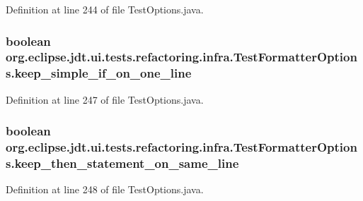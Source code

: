 Definition at line 244 of file TestOptions.java.

\hypertarget{classorg_1_1eclipse_1_1jdt_1_1ui_1_1tests_1_1refactoring_1_1infra_1_1TestFormatterOptions_a6d5e811d1475070205a1b68ec156213f}{
\subsubsection[{keep\_\-simple\_\-if\_\-on\_\-one\_\-line}]{\setlength{\rightskip}{0pt plus 5cm}boolean {\bf org.eclipse.jdt.ui.tests.refactoring.infra.TestFormatterOptions.keep\_\-simple\_\-if\_\-on\_\-one\_\-line}}}
\label{classorg_1_1eclipse_1_1jdt_1_1ui_1_1tests_1_1refactoring_1_1infra_1_1TestFormatterOptions_a6d5e811d1475070205a1b68ec156213f}


Definition at line 247 of file TestOptions.java.

\hypertarget{classorg_1_1eclipse_1_1jdt_1_1ui_1_1tests_1_1refactoring_1_1infra_1_1TestFormatterOptions_a123a66c9316e38dc56c864065be8e127}{
\subsubsection[{keep\_\-then\_\-statement\_\-on\_\-same\_\-line}]{\setlength{\rightskip}{0pt plus 5cm}boolean {\bf org.eclipse.jdt.ui.tests.refactoring.infra.TestFormatterOptions.keep\_\-then\_\-statement\_\-on\_\-same\_\-line}}}
\label{classorg_1_1eclipse_1_1jdt_1_1ui_1_1tests_1_1refactoring_1_1infra_1_1TestFormatterOptions_a123a66c9316e38dc56c864065be8e127}


Definition at line 248 of file TestOptions.java.

